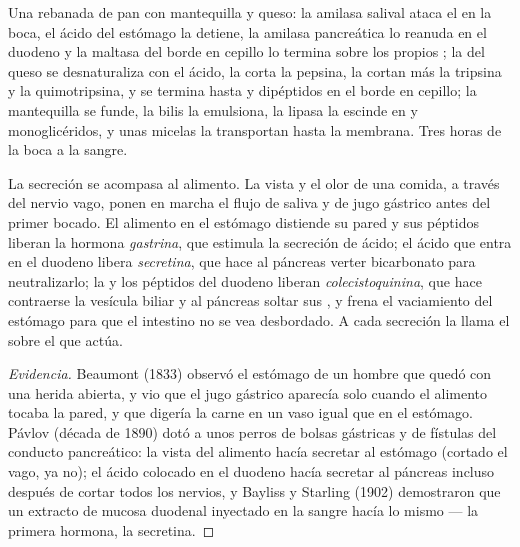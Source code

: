\begin{example}\label{ex:b1:digestion-absorption:meal}
Una rebanada de pan con mantequilla y queso: la amilasa salival ataca el
 en la boca, el ácido del estómago la detiene, la amilasa pancreática
lo reanuda en el duodeno y la maltasa del borde en cepillo lo termina sobre
los propios ; la  del queso se desnaturaliza con el
ácido, la corta la pepsina, la cortan más la tripsina y la quimotripsina, y
se termina hasta  y dipéptidos en el borde en cepillo; la
mantequilla se funde, la bilis la emulsiona, la lipasa la escinde en  y monoglicéridos, y unas micelas la transportan hasta la membrana.
Tres horas de la boca a la sangre.
\end{example}

\begin{proposition}\label{prop:b1:digestion-absorption:control}
La secreción se acompasa al alimento. La vista y el olor de una comida, a
través del nervio vago, ponen en marcha el flujo de saliva y de jugo
gástrico antes del primer bocado. El alimento en el estómago distiende su
pared y sus péptidos liberan la hormona \emph{gastrina}, que estimula la
secreción de ácido; el ácido que entra en el duodeno libera
\emph{secretina}, que hace al páncreas verter bicarbonato para
neutralizarlo; la  y los péptidos del duodeno liberan
\emph{colecistoquinina}, que hace contraerse la vesícula biliar y al
páncreas soltar sus , y frena el vaciamiento del estómago para que el
intestino no se vea desbordado. A cada secreción la llama el  sobre
el que actúa.
\end{proposition}
\begin{proof}[Evidencia]
Beaumont (1833) observó el estómago de un hombre que quedó con una herida
abierta, y vio que el jugo gástrico aparecía solo cuando el alimento tocaba
la pared, y que digería la carne en un vaso igual que en el estómago. Pávlov
(década de 1890) dotó a unos perros de bolsas gástricas y de fístulas del
conducto pancreático: la vista del alimento hacía secretar al estómago
(cortado el vago, ya no); el ácido colocado en el duodeno hacía secretar al
páncreas incluso después de cortar todos los nervios, y Bayliss y Starling
(1902) demostraron que un extracto de mucosa duodenal inyectado en la sangre
hacía lo mismo --- la primera hormona, la secretina.
\end{proof}

